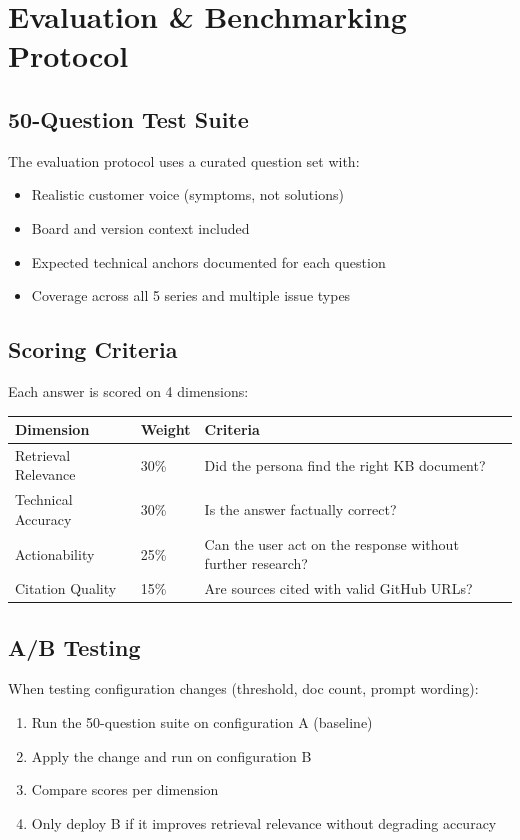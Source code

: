 \documentclass[12pt,a4paper]{report}
\begin{document}
\chapter{Evaluation \& Benchmarking Protocol}

\section{50-Question Test Suite}

The evaluation protocol uses a curated question set with:
\begin{itemize}
  \item Realistic customer voice (symptoms, not solutions)
  \item Board and version context included
  \item Expected technical anchors documented for each question
  \item Coverage across all 5 series and multiple issue types
\end{itemize}

\section{Scoring Criteria}

Each answer is scored on 4 dimensions:

\begin{longtable}{p{3.5cm}p{3cm}p{6.5cm}}
\toprule
\textbf{Dimension} & \textbf{Weight} & \textbf{Criteria} \\
\midrule
Retrieval Relevance & 30\% & Did the persona find the right KB document? \\
Technical Accuracy & 30\% & Is the answer factually correct? \\
Actionability & 25\% & Can the user act on the response without further research? \\
Citation Quality & 15\% & Are sources cited with valid GitHub URLs? \\
\bottomrule
\end{longtable}

\section{A/B Testing}

When testing configuration changes (threshold, doc count, prompt wording):
\begin{enumerate}
  \item Run the 50-question suite on configuration A (baseline)
  \item Apply the change and run on configuration B
  \item Compare scores per dimension
  \item Only deploy B if it improves retrieval relevance without degrading accuracy
\end{enumerate}
\end{document}

